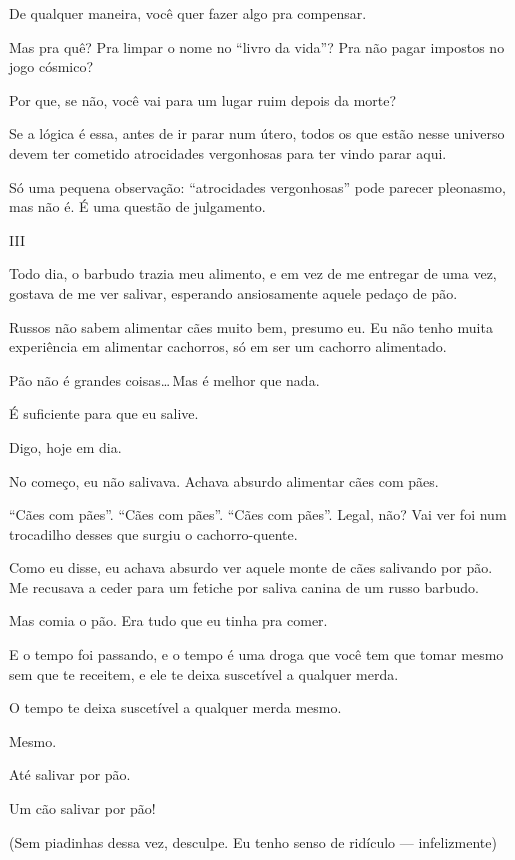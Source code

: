 De qualquer maneira, você quer fazer algo pra compensar.

Mas pra quê? Pra limpar o nome no ``livro da vida''? Pra não pagar impostos no jogo cósmico?

Por que, se não, você vai para um lugar ruim depois da morte?

Se a lógica é essa, antes de ir parar num útero, todos os que estão nesse universo devem ter cometido atrocidades vergonhosas para ter vindo parar aqui.

Só uma pequena observação: ``atrocidades vergonhosas'' pode parecer pleonasmo, mas não é. É uma questão de julgamento.

\begin{center}
{\Large III}
\end{center}

Todo dia, o barbudo trazia meu alimento, e em vez de me entregar de uma vez, gostava de me ver salivar, esperando ansiosamente aquele pedaço de pão.

Russos não sabem alimentar cães muito bem, presumo eu. Eu não tenho muita experiência em alimentar cachorros, só em ser um cachorro alimentado.

Pão não é grandes coisas\ldots\,Mas é melhor que nada.

É suficiente para que eu salive.

Digo, hoje em dia.

No começo, eu não salivava. Achava absurdo alimentar cães com pães.

``Cães com pães''. ``Cães com pães''. ``Cães com pães''. Legal, não? Vai ver foi num trocadilho desses que surgiu o ca\-chor\-ro-quen\-te.

Como eu disse, eu achava absurdo ver aquele monte de cães salivando por pão. Me recusava a ceder para um fetiche por saliva canina de um russo barbudo.

Mas comia o pão. Era tudo que eu tinha pra comer.

E o tempo foi passando, e o tempo é uma droga que você tem que tomar mesmo sem que te receitem, e ele te deixa suscetível a qualquer merda.

O tempo te deixa suscetível a qualquer merda mesmo.

Mesmo.

Até salivar por pão.

Um cão salivar por pão!

(Sem piadinhas dessa vez, desculpe. Eu tenho senso de ridículo --- infelizmente)

